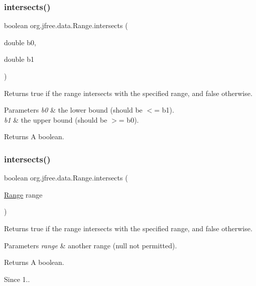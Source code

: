 \subsubsection{\texorpdfstring{intersects()}{intersects()}\hspace{0.1cm}{\footnotesize\ttfamily [1/2]}}
{\footnotesize\ttfamily boolean org.\+jfree.\+data.\+Range.\+intersects (\begin{DoxyParamCaption}\item[{double}]{b0,  }\item[{double}]{b1 }\end{DoxyParamCaption})}

Returns {\ttfamily true} if the range intersects with the specified range, and {\ttfamily false} otherwise.


\begin{DoxyParams}{Parameters}
{\em b0} & the lower bound (should be $<$= b1). \\
\hline
{\em b1} & the upper bound (should be $>$= b0).\\
\hline
\end{DoxyParams}
\begin{DoxyReturn}{Returns}
A boolean. 
\end{DoxyReturn}
\mbox{\label{classorg_1_1jfree_1_1data_1_1_range_a531d1be5f69bb9f0e79451c56c80f639}} 
\subsubsection{\texorpdfstring{intersects()}{intersects()}\hspace{0.1cm}{\footnotesize\ttfamily [2/2]}}
{\footnotesize\ttfamily boolean org.\+jfree.\+data.\+Range.\+intersects (\begin{DoxyParamCaption}\item[{\mbox{\hyperlink{classorg_1_1jfree_1_1data_1_1_range}{Range}}}]{range }\end{DoxyParamCaption})}

Returns {\ttfamily true} if the range intersects with the specified range, and {\ttfamily false} otherwise.


\begin{DoxyParams}{Parameters}
{\em range} & another range ({\ttfamily null} not permitted).\\
\hline
\end{DoxyParams}
\begin{DoxyReturn}{Returns}
A boolean.
\end{DoxyReturn}
\begin{DoxySince}{Since}
1.. 
\end{DoxySince}
\mbox{\label{classorg_1_1jfree_1_1data_1_1_range_a09d0128e6e2048926d9a62baacd0059c}} 
